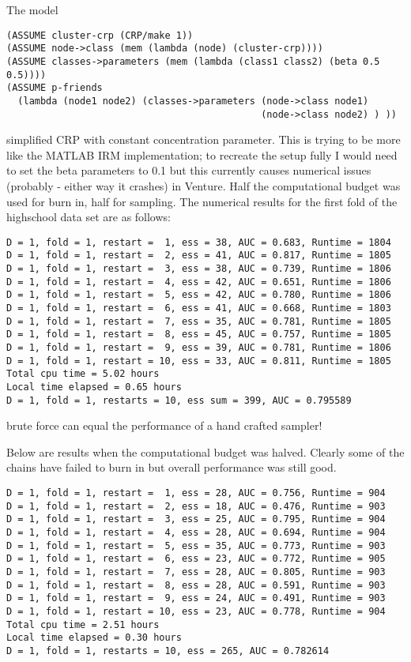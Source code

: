 \documentclass[twoside,11pt]{article}
\begin{document}
The model
%
\begin{lstlisting}[frame=single]
(ASSUME cluster-crp (CRP/make 1))
(ASSUME node->class (mem (lambda (node) (cluster-crp))))
(ASSUME classes->parameters (mem (lambda (class1 class2) (beta 0.5 0.5)))) 
(ASSUME p-friends 
  (lambda (node1 node2) (classes->parameters (node->class node1) 
                                             (node->class node2) ) )) 
\end{lstlisting}
%
\ie simplified CRP with constant concentration parameter.
This is trying to be more like the MATLAB IRM implementation; to recreate the setup fully I would need to set the beta parameters to 0.1 but this currently causes numerical issues (probably - either way it crashes) in Venture.
Half the computational budget was used for burn in, half for sampling.
The numerical results for the first fold of the highschool data set are as follows:
%
\begin{lstlisting}
D = 1, fold = 1, restart =  1, ess = 38, AUC = 0.683, Runtime = 1804
D = 1, fold = 1, restart =  2, ess = 41, AUC = 0.817, Runtime = 1805
D = 1, fold = 1, restart =  3, ess = 38, AUC = 0.739, Runtime = 1806
D = 1, fold = 1, restart =  4, ess = 42, AUC = 0.651, Runtime = 1806
D = 1, fold = 1, restart =  5, ess = 42, AUC = 0.780, Runtime = 1806
D = 1, fold = 1, restart =  6, ess = 41, AUC = 0.668, Runtime = 1803
D = 1, fold = 1, restart =  7, ess = 35, AUC = 0.781, Runtime = 1805
D = 1, fold = 1, restart =  8, ess = 45, AUC = 0.757, Runtime = 1805
D = 1, fold = 1, restart =  9, ess = 39, AUC = 0.781, Runtime = 1806
D = 1, fold = 1, restart = 10, ess = 33, AUC = 0.811, Runtime = 1805
Total cpu time = 5.02 hours
Local time elapsed = 0.65 hours
D = 1, fold = 1, restarts = 10, ess sum = 399, AUC = 0.795589
\end{lstlisting}
%
\ie brute force can equal the performance of a hand crafted sampler!

Below are results when the computational budget was halved.
Clearly some of the chains have failed to burn in but overall performance was still good.
%
\begin{lstlisting}
D = 1, fold = 1, restart =  1, ess = 28, AUC = 0.756, Runtime = 904
D = 1, fold = 1, restart =  2, ess = 18, AUC = 0.476, Runtime = 903
D = 1, fold = 1, restart =  3, ess = 25, AUC = 0.795, Runtime = 904
D = 1, fold = 1, restart =  4, ess = 28, AUC = 0.694, Runtime = 904
D = 1, fold = 1, restart =  5, ess = 35, AUC = 0.773, Runtime = 903
D = 1, fold = 1, restart =  6, ess = 23, AUC = 0.772, Runtime = 905
D = 1, fold = 1, restart =  7, ess = 28, AUC = 0.805, Runtime = 903
D = 1, fold = 1, restart =  8, ess = 28, AUC = 0.591, Runtime = 903
D = 1, fold = 1, restart =  9, ess = 24, AUC = 0.491, Runtime = 903
D = 1, fold = 1, restart = 10, ess = 23, AUC = 0.778, Runtime = 904
Total cpu time = 2.51 hours
Local time elapsed = 0.30 hours
D = 1, fold = 1, restarts = 10, ess = 265, AUC = 0.782614
\end{lstlisting}
%
\end{document}
